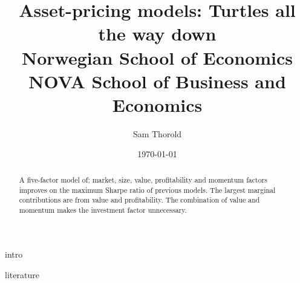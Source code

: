 \documentclass[a4paper, 12pt]{article}
\title{
  {Asset-pricing models: Turtles all the way down}\\
  {\large Norwegian School of Economics}\\
  {\large NOVA School of Business and Economics}
}
\author{Sam Thorold}
\date{\today}
\begin{document}
\maketitle

\begin{abstract}
A five-factor model of; market, size,  value, profitability and momentum 
factors improves on the maximum Sharpe ratio of previous models. The largest 
marginal contributions are from value and profitability. The combination of 
value and momentum makes the investment factor unnecessary.
\end{abstract}

{intro}

{literature}

\printbibliography
\end{document}
